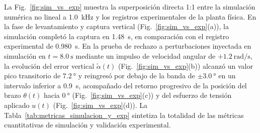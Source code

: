 La Fig.~\ref{fig:sim_vs_exp} muestra la superposición directa 1:1 entre la simulación numérica no lineal a \qty{1.0}{\kilo\hertz} y los registros experimentales de la planta física. En la fase de levantamiento y captura vertical (Fig.~\ref{fig:sim_vs_exp}(a)), la simulación completó la captura en \qty{1.48}{\second}, en comparación con el registro experimental de \qty{0.980}{\second}. En la prueba de rechazo a perturbaciones inyectada en simulación en $t=\qty{8.0}{\second}$ mediante un impulso de velocidad angular de $+\qty{1.2}{\radian\per\second}$, la evolución del error vertical $\tilde{\alpha}(t)$ (Fig.~\ref{fig:sim_vs_exp}(b)) alcanzó un valor pico transitorio de $\qty{7.2}{\degree}$ y reingresó por debajo de la banda de $\pm\qty{3.0}{\degree}$ en un intervalo inferior a \qty{0.9}{\second}, acompañado del retorno progresivo de la posición del brazo $\theta(t)$ hacia $\qty{0}{\degree}$ (Fig.~\ref{fig:sim_vs_exp}(c)) y del esfuerzo de tensión aplicado $u(t)$ (Fig.~\ref{fig:sim_vs_exp}(d)). La Tabla~\ref{tab:metricas_simulacion_y_exp} sintetiza la totalidad de las métricas cuantitativas de simulación y validación experimental.

